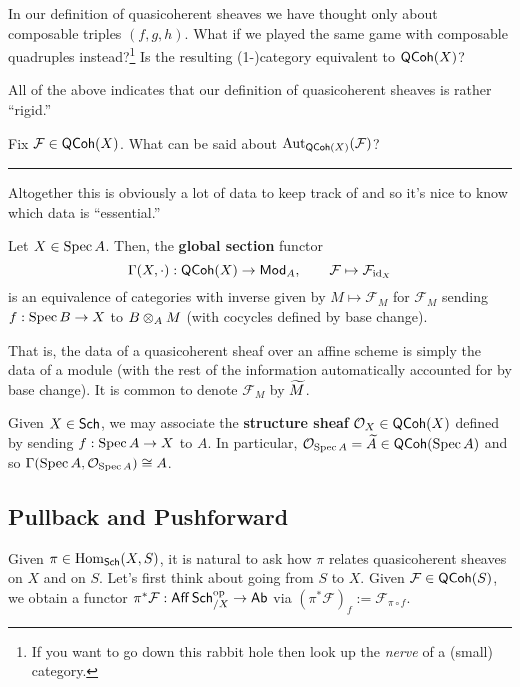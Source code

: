 \documentclass[11pt]{article}
\renewcommand{\F}{\mathcal{F}}
\begin{document}
\begin{exercise}
In our definition of quasicoherent sheaves we have thought only about composable triples $(f,g,h)$. What if we played the same game with composable quadruples instead?\footnote{If you want to go down this rabbit hole then look up the \emph{nerve} of a (small) category.} Is the resulting (1-)category equivalent to $\operatorname{\mathsf{QCoh}}(X)$?
\end{exercise}

All of the above indicates that our definition of quasicoherent sheaves is rather ``rigid.''

\begin{exercise}
Fix $\F\in\QCoh(X)$. What can be said about $\Aut_{\QCoh(X)}(\F)$?
\end{exercise}

\hrule

Altogether this is obviously a lot of data to keep track of and so it's nice to know which data is ``essential.''

\begin{theorem}
Let $X\in\operatorname{Spec} A$. Then, the \textbf{global section} functor 
$$\Gamma(X,\cdot): \QCoh(X)\to\Mod_A,\qquad \F\mapsto\F_{\id_X}$$
is an equivalence of categories with inverse given by $M\mapsto\F_M$ for $\F_M$ sending $f: \operatorname{Spec} B\to X$ to $B\otimes_AM$ (with cocycles defined by base change).
\end{theorem}

That is, the data of a quasicoherent sheaf over an affine scheme is simply the data of a module (with the rest of the information automatically accounted for by base change). It is common to denote $\F_M$ by $\widetilde{M}$.

\begin{example}
Given $X\in\operatorname{\mathsf{Sch}}$, we may associate the \textbf{structure sheaf} $\mathcal{O}_X\in\operatorname{\mathsf{QCoh}}(X)$ defined by sending $f: \operatorname{Spec} A\to X$ to $A$. In particular, $\mathcal{O}_{\operatorname{Spec} A}=\widetilde{A}\in\operatorname{\mathsf{QCoh}}(\operatorname{Spec} A)$ and so $\Gamma(\operatorname{Spec} A,\mathcal{O}_{\operatorname{Spec} A})\cong A$.
\end{example}

\subsection{Pullback and Pushforward}
Given $\pi\in\operatorname{Hom}_{\operatorname{\mathsf{Sch}}}(X,S)$, it is natural to ask how $\pi$ relates quasicoherent sheaves on $X$ and on $S$. Let's first think about going from $S$ to $X$. Given $\F\in\QCoh(S)$, we obtain a functor $\pi^*\F: \Aff\Sch_{/X}^{\op}\to\Ab$ via $(\pi^*\F)_f:=\F_{\pi\circ f}$.
\end{document}
